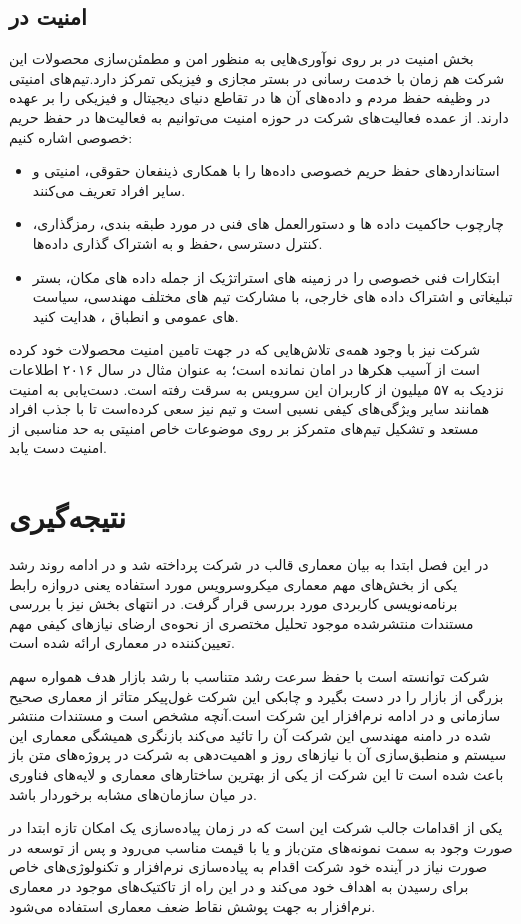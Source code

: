 \subsection{امنیت در }
بخش امنیت در  بر روی نوآوری‌هایی به منظور امن و مطمئن‌سازی محصولات این شرکت هم زمان با خدمت رسانی در بستر مجازی و فیزیکی تمرکز دارد.تیم‌های امنیتی در  وظیفه حفظ مردم و داده‌های آن ها در تقاطع دنیای دیجیتال و فیزیکی را بر عهده دارند. از عمده فعالیت‌های شرکت  در حوزه امنیت می‌توانیم به فعالیت‌ها در حفظ حریم خصوصی اشاره کنیم:
\begin{itemize}
\item
استانداردهای حفظ حریم خصوصی داده‌ها را با همکاری ذینفعان حقوقی، امنیتی و سایر افراد تعریف می‌کنند.
\item
چارچوب حاکمیت داده ها و دستورالعمل های فنی در مورد طبقه بندی، رمزگذاری، کنترل دسترسی ،حفظ و به اشتراک گذاری داده‌ها.
\item
ابتکارات فنی خصوصی را در زمینه های استراتژیک از جمله داده های مکان، بستر تبلیغاتی و اشتراک داده های خارجی، با مشارکت تیم های مختلف مهندسی، سیاست های عمومی و انطباق ، هدایت کنید.
\end{itemize}
شرکت  نیز با وجود همه‌ی تلاش‌هایی که در جهت تامین امنیت محصولات خود کرده است از آسیب هکر‌ها در امان نمانده است؛ به عنوان مثال در سال ۲۰۱۶ اطلاعات نزدیک به ۵۷ میلیون از کاربران این سرویس به سرقت رفته است.\cite{uberhacked} دست‌یابی به امنیت همانند سایر ویژگی‌های کیفی نسبی است و تیم  نیز سعی کرده‌است تا با جذب افراد مستعد و تشکیل تیم‌های متمرکز بر روی موضوعات خاص امنیتی به حد مناسبی از امنیت دست یابد.
\section{نتیجه‌گیری}
در این فصل ابتدا به بیان معماری قالب در شرکت  پرداخته شد و در ادامه روند رشد یکی از بخش‌های مهم معماری میکرو‌سرویس مورد استفاده یعنی دروازه رابط برنامه‌نویسی کاربردی مورد بررسی قرار گرفت. در انتهای بخش نیز با بررسی مستندات منتشر‌شده موجود تحلیل مختصری از نحوه‌ی ارضای نیاز‌های کیفی مهم تعیین‌کننده در معماری ارائه شده است.

شرکت  توانسته است با حفظ سرعت رشد متناسب با رشد بازار هدف همواره سهم بزرگی از بازار را در دست بگیرد و چابکی این شرکت غول‌پیکر متاثر از معماری صحیح سازمانی و در ادامه نرم‌افزار این شرکت است.آنچه مشخص است و مستندات منتشر شده در دامنه مهندسی این شرکت آن را تائید می‌کند بازنگری همیشگی معماری این سیستم و منطبق‌سازی آن با نیاز‌های روز و اهمیت‌دهی به شرکت در پروژه‌های متن باز\cite{ubergithub} باعث شده است تا این شرکت از یکی از بهترین ساختار‌های معماری و لایه‌های فناوری در میان سازمان‌های مشابه برخوردار باشد.

یکی از اقدامات جالب شرکت  این است که در زمان پیاده‌سازی یک امکان تازه ابتدا در صورت وجود به سمت نمونه‌های متن‌باز و یا با قیمت مناسب می‌رود و پس از توسعه در صورت نیاز در آینده خود شرکت اقدام به پیاده‌سازی نرم‌افزار و تکنولوژی‌های خاص برای رسیدن به اهداف خود می‌کند و در این راه از تاکتیک‌های موجود در معماری نرم‌افزار به جهت پوشش نقاط ضعف معماری استفاده می‌شود.
